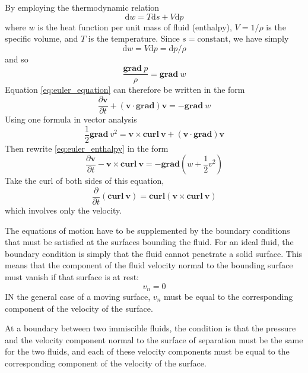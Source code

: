 \documentclass[conference]{IEEEtran}
\theoremstyle{definition}
\theoremstyle{remark}
\begin{document}
    By employing the thermodynamic relation
    \[
        \mathrm{d} w = T \mathrm{d} s + V \mathrm{d} p
    \]
    where $w$ is the heat function per unit mass of fluid (enthalpy), $V = 1 / \rho$ is the specific volume, and $T$ is the temperature. Since $s = \text{constant}$, we have simply
    \[
        \mathrm{d} w = V \mathrm{d} p = \mathrm{d} p / \rho
    \]
    and so
    \[
        \dfrac{\textbf{grad} \ p}{\rho} = \textbf{grad} \ w
    \]
    Equation \ref{eq:euler_equation} can therefore be written in the form
    \begin{equation}
        \dfrac{\partial \mathbf{v}}{\partial t} + (\mathbf{v} \cdot \textbf{grad}) \mathbf{v} = - \textbf{grad} \ w
        \label{eq:euler_enthalpy}
    \end{equation}
    Using one formula in vector analysis
    \[
        \dfrac12 \textbf{grad} \ v^2 = \mathbf{v} \times \textbf{curl} \ \mathbf{v} + (\mathbf{v} \cdot \textbf{grad}) \mathbf{v}
    \]
    Then rewrite \ref{eq:euler_enthalpy} in the form
    \begin{equation}
        \dfrac{\partial \mathbf{v}}{\partial t} - \mathbf{v} \times \textbf{curl} \ \mathbf{v} = -\textbf{grad} (w + \dfrac12 v^2)
    \end{equation}
    Take the curl of both sides of this equation,
    \begin{equation}
        \dfrac{\partial}{\partial t} (\textbf{curl}\ \mathbf{v}) = \textbf{curl} (\mathbf{v} \times \textbf{curl} \ \mathbf{v})
        \label{eq:euler_velocity}
    \end{equation}
    which involves only the velocity.

    The equations of motion have to be supplemented by the boundary conditions that must be satisfied at the surfaces bounding the fluid. For an ideal fluid, the boundary condition is simply that the fluid cannot penetrate a solid surface. This means that the component of the fluid velocity normal to the bounding surface must vanish if that surface is at rest:
    \begin{equation}
        v_n = 0
    \end{equation}
    IN the general case of a moving surface, $v_n$ must be equal to the corresponding component of the velocity of the surface.

    At a boundary between two immiscible fluids, the condition is that the pressure and the velocity component normal to the surface of separation must be the same for the two fluids, and each of these velocity components must be equal to the corresponding component of the velocity of the surface.
\end{document}
